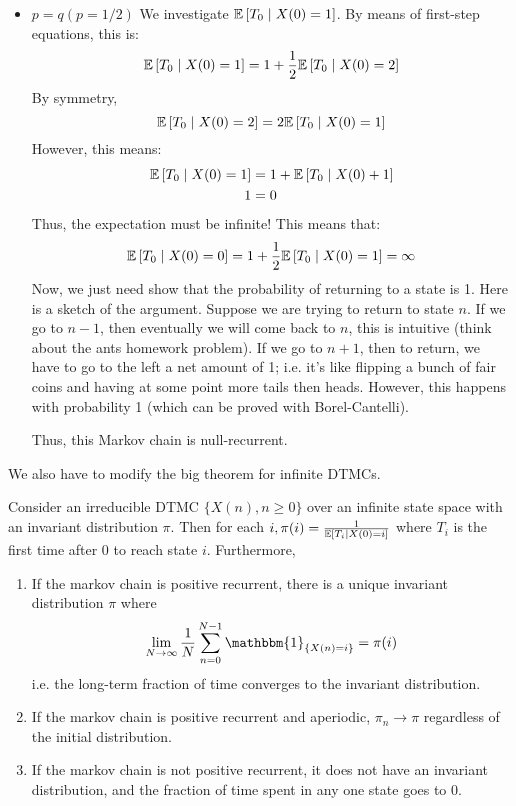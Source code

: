 \begin{proof*}
    \begin{itemize}
        \item $p = q (p = 1/2)$
        We investigate $\mathbb{E}\left[ T_0 \mid X(0) = 1 \right]$. By means of first-step equations, this is:
        \[\mathbb{E}\left[ T_0 \mid X(0) = 1 \right] = 1 + \frac{1}{2} \mathbb{E}\left[ T_0 \mid X(0) = 2 \right] \]
        By symmetry,
        \[ \mathbb{E}\left[ T_0 \mid X(0) = 2 \right] = 2 \mathbb{E}\left[ T_0 \mid X(0) = 1 \right] \]
        However, this means:
        \begin{align*}
            \mathbb{E}\left[ T_0 \mid X(0) = 1 \right] &= 1 + \mathbb{E}\left[ T_0 \mid X(0) + 1 \right] \\
            1 &= 0
        \end{align*}
        Thus, the expectation must be infinite! This means that:
        \[ \mathbb{E}\left[ T_0 \mid X(0) = 0 \right] = 1 + \frac{1}{2} \mathbb{E}\left[ T_0 \mid X(0) = 1 \right] = \infty \]
        Now, we just need show that the probability of returning to a state is 1.
        Here is a sketch of the argument.
        Suppose we are trying to return to state $n$. If we go to $n - 1$, then eventually we will come back to $n$,
        this is intuitive (think about the ants homework problem). If we go to $n + 1$, then to return, we have to go to the left
        a net amount of 1; i.e. it's like flipping a bunch of fair coins and having at some point more tails then heads. However,
        this happens with probability 1 (which can be proved with Borel-Cantelli).

        Thus, this Markov chain is null-recurrent.
    \end{itemize}

\end{proof*}

We also have to modify the big theorem for infinite DTMCs.

\begin{theorem}
    Consider an irreducible DTMC $\{X(n), n \geq 0\}$ over an infinite state space with an invariant
    distribution $\pi$. Then for each $i, \pi(i) = \frac{1}{\mathbb{E}\left[ T_i \mid X(0) = i \right]}$ where $T_i$ is
    the first time after 0 to reach state $i$. Furthermore,

    \begin{enumerate}
        \item If the markov chain is positive recurrent, there is a unique invariant distribution $\pi$ where
        \begin{align*}
            \lim_{N \to \infty} \frac{1}{N} \sum_{n = 0}^{N - 1} \mathbbm{1}_{\{X(n) = i\}} = \pi(i)
        \end{align*}
        i.e. the long-term fraction of time converges to the invariant distribution.
        \item If the markov chain is positive recurrent and aperiodic, $\pi_n \to \pi$ regardless of the initial distribution.
        \item If the markov chain is not positive recurrent, it does not have an invariant distribution, and the
        fraction of time spent in any one state goes to 0.
    \end{enumerate}
\end{theorem}

